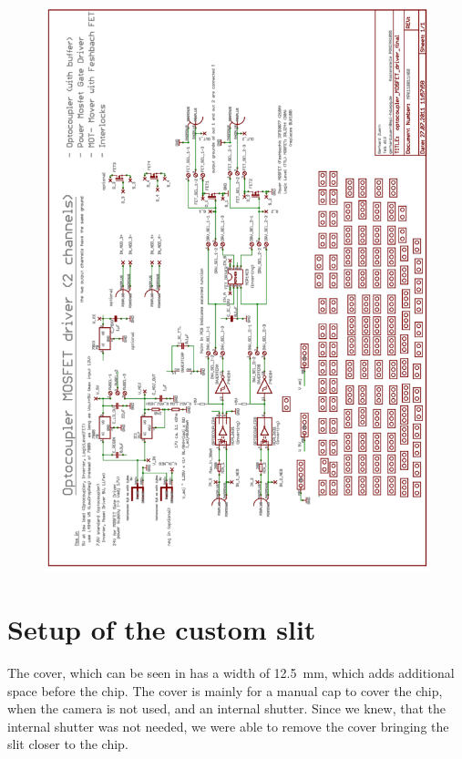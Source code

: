 \begin{figure}[htb]
	\begin{center}
		\includegraphics[width=\textwidth]{drafts/shutter_circuit.pdf}
	\end{center}
\end{figure}

\chapter{Setup of the custom slit}


The cover, which can be seen in  has a width of \SI{12.5}{\milli\meter}, which adds additional space before the chip. The cover is mainly for a manual cap to cover the chip, when the camera is not used, and an internal shutter. Since we knew, that the internal shutter was not needed, we were able to remove the cover bringing the slit closer to the chip.

